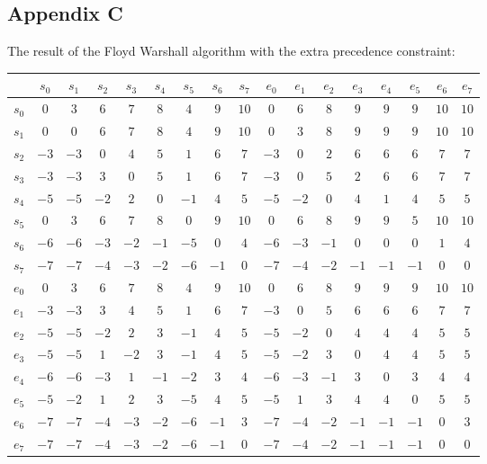 \documentclass{article}
\theoremstyle{definition}
\begin{document}
\subsection*{Appendix C}
\label{appendix:c}
The result of the Floyd Warshall algorithm with the extra precedence constraint:\\
\begin{tabular}{c | cccccccccccccccc}
	&$s_0$	&$s_1$ &$s_2$ &$s_3$ &$s_4$ &$s_5$ &$s_6$ &$s_7$ &$e_0$ &$e_1$ &$e_2$ &$e_3$ &$e_4$ &$e_5$ &$e_6$ &$e_7$\\
\hline
$s_0$	&$0$	&$3$	&$6$	&$7$	&$8$	&$4$	&$9$	&$10$	&$0$	&$6$	&$8$	&$9$	&$9$	&$9$	&$10$	&$10$	\\
$s_1$	&$0$	&$0$	&$6$	&$7$	&$8$	&$4$	&$9$	&$10$	&$0$	&$3$	&$8$	&$9$	&$9$	&$9$	&$10$	&$10$	\\
$s_2$	&$-3$	&$-3$	&$0$	&$4$	&$5$	&$1$	&$6$	&$7$	&$-3$	&$0$	&$2$	&$6$	&$6$	&$6$	&$7$	&$7$\\
$s_3$	&$-3$	&$-3$	&$3$	&$0$	&$5$	&$1$	&$6$	&$7$	&$-3$	&$0$	&$5$	&$2$	&$6$	&$6$	&$7$	&$7$\\
$s_4$	&$-5$	&$-5$	&$-2$	&$2$	&$0$	&$-1$	&$4$	&$5$	&$-5$	&$-2$	&$0$	&$4$	&$1$	&$4$	&$5$	&$5$\\
$s_5$	&$0$	&$3$	&$6$	&$7$	&$8$	&$0$	&$9$	&$10$	&$0$	&$6$	&$8$	&$9$	&$9$	&$5$	&$10$	&$10$	\\
$s_6$	&$-6$	&$-6$	&$-3$	&$-2$	&$-1$	&$-5$	&$0$	&$4$	&$-6$	&$-3$	&$-1$	&$0$	&$0$	&$0$	&$1$	&$4$\\
$s_7$	&$-7$	&$-7$	&$-4$	&$-3$	&$-2$	&$-6$	&$-1$	&$0$	&$-7$	&$-4$	&$-2$	&$-1$	&$-1$	&$-1$	&$0$	&$0$\\
$e_0$	&$0$	&$3$	&$6$	&$7$	&$8$	&$4$	&$9$	&$10$	&$0$	&$6$	&$8$	&$9$	&$9$	&$9$	&$10$	&$10$	\\
$e_1$	&$-3$	&$-3$	&$3$	&$4$	&$5$	&$1$	&$6$	&$7$	&$-3$	&$0$	&$5$	&$6$	&$6$	&$6$	&$7$	&$7$\\
$e_2$	&$-5$	&$-5$	&$-2$	&$2$	&$3$	&$-1$	&$4$	&$5$	&$-5$	&$-2$	&$0$	&$4$	&$4$	&$4$	&$5$	&$5$\\
$e_3$	&$-5$	&$-5$	&$1$	&$-2$	&$3$	&$-1$	&$4$	&$5$	&$-5$	&$-2$	&$3$	&$0$	&$4$	&$4$	&$5$	&$5$\\
$e_4$	&$-6$	&$-6$	&$-3$	&$1$	&$-1$	&$-2$	&$3$	&$4$	&$-6$	&$-3$	&$-1$	&$3$	&$0$	&$3$	&$4$	&$4$\\
$e_5$	&$-5$	&$-2$	&$1$	&$2$	&$3$	&$-5$	&$4$	&$5$	&$-5$	&$1$	&$3$	&$4$	&$4$	&$0$	&$5$	&$5$\\
$e_6$	&$-7$	&$-7$	&$-4$	&$-3$	&$-2$	&$-6$	&$-1$	&$3$	&$-7$	&$-4$	&$-2$	&$-1$	&$-1$	&$-1$	&$0$	&$3$\\
$e_7$	&$-7$	&$-7$	&$-4$	&$-3$	&$-2$	&$-6$	&$-1$	&$0$	&$-7$	&$-4$	&$-2$	&$-1$	&$-1$	&$-1$	&$0$	&$0$\\
\end{tabular}
\end{document}
